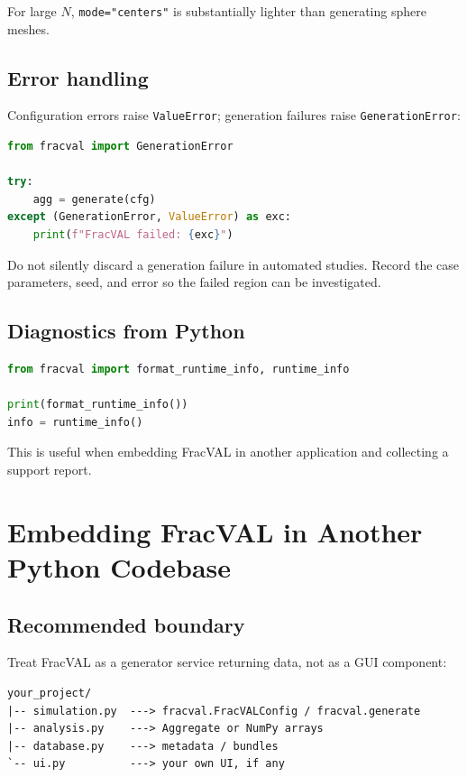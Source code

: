 \documentclass[11pt,oneside]{report}
\newcommand{\code}[1]{\texttt{#1}}
\begin{document}
For large \(N\), \code{mode="centers"} is substantially lighter than generating
sphere meshes.

\section{Error handling}

Configuration errors raise \code{ValueError}; generation failures raise
\code{GenerationError}:

\begin{lstlisting}[language=Python]
from fracval import GenerationError

try:
    agg = generate(cfg)
except (GenerationError, ValueError) as exc:
    print(f"FracVAL failed: {exc}")
\end{lstlisting}

Do not silently discard a generation failure in automated studies. Record the
case parameters, seed, and error so the failed region can be investigated.

\section{Diagnostics from Python}

\begin{lstlisting}[language=Python]
from fracval import format_runtime_info, runtime_info

print(format_runtime_info())
info = runtime_info()
\end{lstlisting}

This is useful when embedding FracVAL in another application and collecting a
support report.

\chapter{Embedding FracVAL in Another Python Codebase}

\section{Recommended boundary}

Treat FracVAL as a generator service returning data, not as a GUI component:

\begin{lstlisting}
your_project/
|-- simulation.py  ---> fracval.FracVALConfig / fracval.generate
|-- analysis.py    ---> Aggregate or NumPy arrays
|-- database.py    ---> metadata / bundles
`-- ui.py          ---> your own UI, if any
\end{lstlisting}
\end{document}

